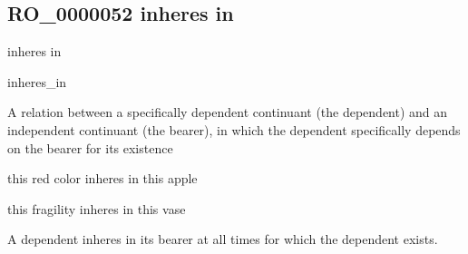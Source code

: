 \documentclass[letterpaper,10pt,english]{sphinxmanual}
\begin{document}
\subsection{RO\_0000052 \sphinxhyphen{} inheres in}
\label{\detokenize{doc-RO_0000052:ro-0000052-inheres-in}}\label{\detokenize{doc-RO_0000052:index-0}}\label{\detokenize{doc-RO_0000052::doc}}
\begin{sphinxShadowBox}

\sphinxAtStartPar
inheres in
\end{sphinxShadowBox}

\begin{sphinxShadowBox}

\sphinxAtStartPar
inheres\_in
\end{sphinxShadowBox}

\begin{sphinxShadowBox}

\sphinxAtStartPar
{}
\end{sphinxShadowBox}

\begin{sphinxShadowBox}

\sphinxAtStartPar
A relation between a specifically dependent continuant (the dependent) and an independent continuant (the bearer), in which the dependent specifically depends on the bearer for its existence
\end{sphinxShadowBox}

\begin{sphinxShadowBox}

\sphinxAtStartPar
this red color inheres in this apple

\sphinxAtStartPar
this fragility inheres in this vase
\end{sphinxShadowBox}

\begin{sphinxShadowBox}

\sphinxAtStartPar
A dependent inheres in its bearer at all times for which the dependent exists.
\end{sphinxShadowBox}

\begin{sphinxShadowBox}

\sphinxAtStartPar
{}
\end{sphinxShadowBox}
\begin{quote}

\ignorespaces \end{quote}
\end{document}
